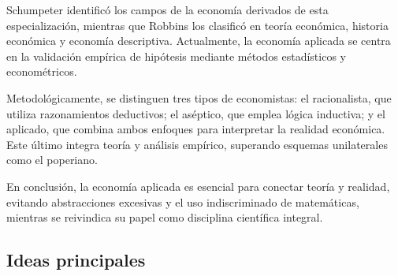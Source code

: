 \documentclass[12pt]{report} %
\begin{document}
Schumpeter identificó los campos de la economía derivados de esta
especialización, mientras que Robbins los clasificó en teoría económica,
historia económica y economía descriptiva. Actualmente, la economía
aplicada se centra en la validación empírica de hipótesis mediante
métodos estadísticos y econométricos.

Metodológicamente, se distinguen tres tipos de economistas: el
racionalista, que utiliza razonamientos deductivos; el aséptico, que
emplea lógica inductiva; y el aplicado, que combina ambos enfoques para
interpretar la realidad económica. Este último integra teoría y análisis
empírico, superando esquemas unilaterales como el poperiano.

En conclusión, la economía aplicada es esencial para conectar teoría y
realidad, evitando abstracciones excesivas y el uso indiscriminado de
matemáticas, mientras se reivindica su papel como disciplina científica
integral.

\hypertarget{ideas-principales}{%
\subsection{Ideas principales}\label{ideas-principales}}
\end{document}
